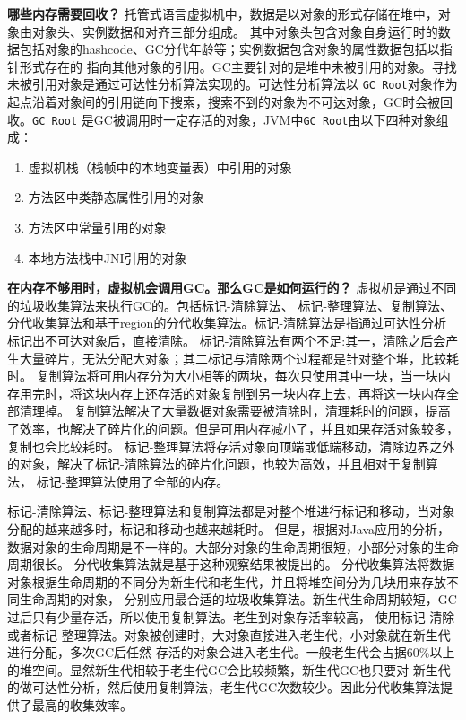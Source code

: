 \textbf{哪些内存需要回收？} 托管式语言虚拟机中，数据是以对象的形式存储在堆中，对象由对象头、实例数据和对齐三部分组成。
其中对象头包含对象自身运行时的数据包括对象的hashcode、GC分代年龄等；实例数据包含对象的属性数据包括以指针形式存在的
指向其他对象的引用。GC主要针对的是堆中未被引用的对象。寻找未被引用对象是通过可达性分析算法实现的。可达性分析算法以
\texttt{GC Root}对象作为起点沿着对象间的引用链向下搜索，搜索不到的对象为不可达对象，GC时会被回收。\texttt{GC Root}
是GC被调用时一定存活的对象，JVM中\texttt{GC Root}由以下四种对象组成：
\begin{enumerate}
    \item 虚拟机栈（栈帧中的本地变量表）中引用的对象
    \item 方法区中类静态属性引用的对象
    \item 方法区中常量引用的对象
    \item 本地方法栈中JNI引用的对象
\end{enumerate}

\textbf{在内存不够用时，虚拟机会调用GC。那么GC是如何运行的？} 虚拟机是通过不同的垃圾收集算法来执行GC的。包括标记-清除算法、
标记-整理算法、复制算法、分代收集算法和基于region的分代收集算法。标记-清除算法是指通过可达性分析标记出不可达对象后，直接清除。
标记-清除算法有两个不足:其一，清除之后会产生大量碎片，无法分配大对象；其二标记与清除两个过程都是针对整个堆，比较耗时。
复制算法将可用内存分为大小相等的两块，每次只使用其中一块，当一块内存用完时，将这块内存上还存活的对象复制到另一块内存上去，再将这一块内存全部清理掉。
复制算法解决了大量数据对象需要被清除时，清理耗时的问题，提高了效率，也解决了碎片化的问题。但是可用内存减小了，并且如果存活对象较多，复制也会比较耗时。
标记-整理算法将存活对象向顶端或低端移动，清除边界之外的对象，解决了标记-清除算法的碎片化问题，也较为高效，并且相对于复制算法，
标记-整理算法使用了全部的内存。

标记-清除算法、标记-整理算法和复制算法都是对整个堆进行标记和移动，当对象分配的越来越多时，标记和移动也越来越耗时。
但是，根据对Java应用的分析，数据对象的生命周期是不一样的。大部分对象的生命周期很短，小部分对象的生命周期很长。
分代收集算法就是基于这种观察结果被提出的。
分代收集算法将数据对象根据生命周期的不同分为新生代和老生代，并且将堆空间分为几块用来存放不同生命周期的对象，
分别应用最合适的垃圾收集算法。新生代生命周期较短，GC过后只有少量存活，所以使用复制算法。老生到对象存活率较高，
使用标记-清除或者标记-整理算法。对象被创建时，大对象直接进入老生代，小对象就在新生代进行分配，多次GC后任然
存活的对象会进入老生代。一般老生代会占据60\%以上的堆空间。显然新生代相较于老生代GC会比较频繁，新生代GC也只要对
新生代的做可达性分析，然后使用复制算法，老生代GC次数较少。因此分代收集算法提供了最高的收集效率。

